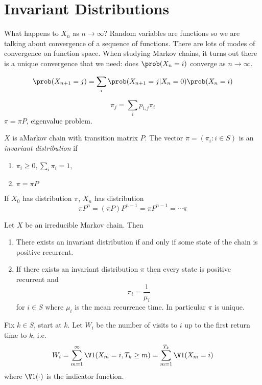 \documentclass[a4paper]{article}
\begin{document}
\section{Invariant Distributions}

What happens to \(X_n\) as \(n \to \infty\)? Random variables are functions so we are talking about convergence of a sequence of functions. There are lots of modes of convergence on function space. When studying Markov chains, it turns out there is a unique convergence that we need: does \(\prob(X_n = i)\) converge as \(n \to \infty\).

\[
  \prob(X_{n + 1} = j) = \sum_i \prob(X_{n + 1} = j | X_n = 0) \prob(X_n = i)
\]

\[
  \pi_j = \sum_i p_{i,j} \pi_i
\]
\(\pi = \pi P\), eigenvalue problem.

\begin{definition}
  \(X\) is aMarkov chain with transition matrix \(P\). The vector \(\pi = (\pi_i: i \in S)\) is an \emph{invariant distribution} if
  \begin{enumerate}
  \item \(\pi_i \geq 0, \sum_i \pi_i = 1\),
  \item \(\pi = \pi P\)
  \end{enumerate}
\end{definition}

If \(X_0\) has distribution \(\pi\), \(X_n\) has distribution
\[
  \pi P^n = (\pi P) P^{n - 1} = \pi P^{n - 1} = \cdots \pi
\]

\begin{theorem}
  Let \(X\) be an irreducible Markov chain. Then
  \begin{enumerate}
  \item There exists an invariant distribution if and only if some state of the chain is positive recurrent.
  \item If there exists an invariant distribution \(\pi\) then every state is positive recurrent and
    \[
      \pi_i = \frac{1}{\mu_i}
    \]
    for \(i \in S\) where \(\mu_i\) is the mean recurrence time. In particular \(\pi\) is unique.
  \end{enumerate}
\end{theorem}

Fix \(k \in S\), start at \(k\). Let \(W_i\) be the number of visits to \(i\) up to the first return time to \(k\), i.e.
\[
  W_i = \sum_{m = 1}^{\infty} \V 1(X_m = i, T_k \geq m) = \sum_{m = 1}^{T_k} \V 1(X_m = i)
\]
where \(\V 1(\cdot)\) is the indicator function.
\end{document}
